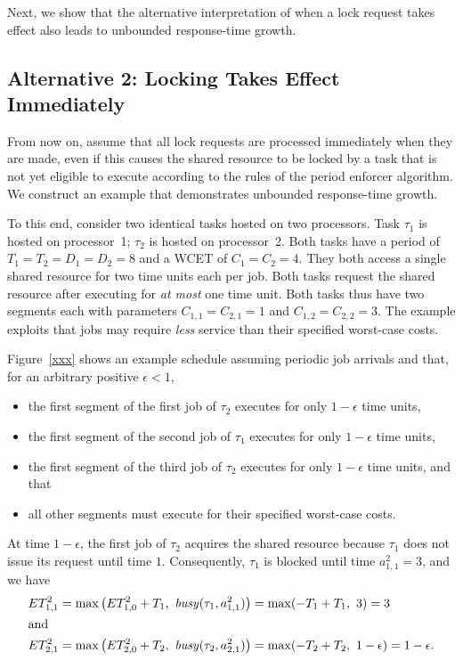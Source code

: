 Next, we show that the alternative interpretation of when a lock request takes effect also leads to unbounded response-time growth.


\subsection{Alternative 2: Locking Takes Effect Immediately}
From now on, assume that all lock requests are processed immediately when they are made, even if this causes the shared resource to be locked by a task that is not yet eligible to execute according to  the rules of the period enforcer algorithm. We construct an example that demonstrates unbounded response-time growth.

To this end, consider two identical tasks hosted on two processors. Task $\tau_1$ is hosted on processor~1; $\tau_2$ is hosted on processor~2. Both tasks have a period of $T_1 = T_2 = D_1 = D_2 = 8$ and a WCET of $C_1 = C_2 = 4$. They both access a single shared resource for two time units each per job. Both tasks request the shared resource after executing for \emph{at most} one time unit. Both tasks thus have two segments each with parameters $C_{1,1} = C_{2,1} = 1$ and $C_{1,2} = C_{2,2} = 3$. The example exploits that jobs may require \emph{less} service than their specified worst-case costs.

Figure~\ref{xxx} shows an example schedule assuming periodic job arrivals and that, for an arbitrary positive $\epsilon <1$,
\begin{itemize}
	\item the first segment of the first job of $\tau_2$ executes for only $1-\epsilon$ time units,
	\item the first segment of the second job of $\tau_1$ executes for only $1-\epsilon$ time units,
	\item the first segment of the third job  of $\tau_2$ executes for only $1-\epsilon$ time units, and that
	\item all other segments must execute for their specified worst-case costs.
\end{itemize}

At time $1-\epsilon$, the first job of $\tau_2$ acquires the shared resource because $\tau_1$ does not issue its request until time $1$. Consequently, $\tau_1$ is blocked until time $a^2_{1,1} = 3$, and we have
\begin{align*}
	ET_{1,1}^2 & = \max\left(ET_{1,0}^2 + T_1,\ \mathit{busy}(\tau_1, a^2_{1,1})\right) =\max(-T_1 + T_1,\ 3) = 3 
\\ \intertext{and}
	ET_{2,1}^2 & = \max\left(ET_{2,0}^2 + T_2,\ \mathit{busy}(\tau_2, a^2_{2,1})\right) =\max(-T_2 + T_2,\ 1 - \epsilon) = 1 - \epsilon.
\end{align*}

